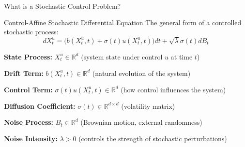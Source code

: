 \documentclass[aspectratio=169,xcolor=dvipsnames]{beamer}
\begin{document}
\begin{frame}{What is a Stochastic Control Problem?}
    
    \begin{block}{Control-Affine Stochastic Differential Equation}
        The general form of a controlled stochastic process:
        \begin{equation}
        dX_t^u = \big(b(X_t^u, t) + \sigma(t)u(X_t^u, t)\big) dt + \sqrt{\lambda}\sigma(t) dB_t
        \end{equation}
    \end{block}

            \vspace{0.3cm}
    
            \textbf{State Process:} $X_t^u \in \mathbb{R}^d$ (system state under control $u$ at time $t$)
            
            \vspace{0.3cm}
            
            \textbf{Drift Term:} $b(X_t^u, t) \in \mathbb{R}^d$ (natural evolution of the system)
            
            \vspace{0.3cm}
            
            \textbf{Control Term:} $\sigma(t)u(X_t^u, t) \in \mathbb{R}^d$ (how control influences the system)
            
            \vspace{0.3cm}
            
            \textbf{Diffusion Coefficient:} $\sigma(t) \in \mathbb{R}^{d \times d}$ (volatility matrix)
            
            \vspace{0.3cm}
            
            \textbf{Noise Process:} $B_t \in \mathbb{R}^d$ (Brownian motion, external randomness)
            
            \vspace{0.3cm}
            
            \textbf{Noise Intensity:} $\lambda > 0$ (controls the strength of stochastic perturbations)

\end{frame}
\end{document}
